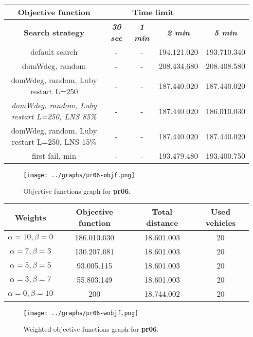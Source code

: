 {
\renewcommand{\arraystretch}{2}
\begin{longtable}[h]{| c | c | c | c | c |}
    \hline
    \textbf{Objective function} & \multicolumn{3}{c}{Time limit} & \\
    \hline
    \textbf{Search strategy} & \textbf{\textit{30 sec}} & \textbf{\textit{1 min}} & \textbf{\textit{2 min}} & \textbf{\textit{5 min}} \\
    \hline
    \endhead
    default search                                         & - & - & 194.121.020 & 193.710.340 \\
    \hline
    domWdeg, random                                        & - & - & 208.434.680 & 208.408.580 \\
    \hline
    domWdeg, random, Luby restart L=250                    & - & - & 187.440.020 & 187.440.020 \\
    \hline
    \textit{domWdeg, random, Luby restart L=250, LNS 85\%} & - & - & 187.440.020 & 186.010.030 \\
    \hline
    domWdeg, random, Luby restart L=250, LNS 15\%          & - & - & 187.440.020 & 187.440.020 \\
    \hline
    first fail, min                                        & - & - & 193.479.480 & 193.400.750 \\
    \hline
\end{longtable}
}
\begin{figure}[H]
    \centering
    \texttt{[image: ../graphs/pr06-objf.png]}
    \caption{Objective functions graph for \textbf{pr06}.}
\end{figure}

{
\renewcommand{\arraystretch}{2}
\begin{longtable}[h]{| c | c | c | c |}
    \hline
    \textbf{Weights} & \textbf{Objective function} & \textbf{Total distance} & \textbf{Used vehicles} \\
    \hline
    \endhead
    $\alpha = 10, \beta = 0$ & 186.010.030 & 18.601.003 & 20 \\
    \hline
    $\alpha = 7, \beta = 3$  & 130.207.081 & 18.601.003 & 20 \\
    \hline
    $\alpha = 5, \beta = 5$  &  93.005.115 & 18.601.003 & 20 \\
    \hline
    $\alpha = 3, \beta = 7$  &  55.803.149 & 18.601.003 & 20 \\
    \hline
    $\alpha = 0, \beta = 10$ &         200 & 18.744.002 & 20 \\
    \hline
\end{longtable}
}
\begin{figure}[H]
    \centering
    \texttt{[image: ../graphs/pr06-wobjf.png]}
    \caption{Weighted objective functions graph for \textbf{pr06}.}
\end{figure}

